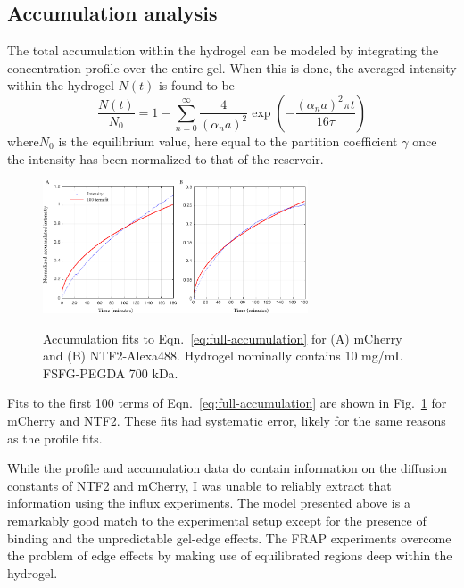\subsection{Accumulation analysis}

The total accumulation within the hydrogel can be modeled by integrating the concentration profile over the entire gel.  When this is done, the averaged intensity within the hydrogel $N(t)$ is found to be
\begin{equation}
\frac{N(t)}{N_0} = 1-\sum_{n=0}^\infty \frac{4}{(\alpha_na)^2}\exp\left(-\frac{(\alpha_na)^2\pi t}{16\tau}\right)
\label{eq:full-accumulation}
\end{equation} where$N_0$ is the equilibrium value, here equal to the partition coefficient $\gamma$ once the intensity has been normalized to that of the reservoir.

\begin{figure}
\caption{Accumulation fits to Eqn.~\ref{eq:full-accumulation} for (A) mCherry and (B) NTF2-Alexa488.  Hydrogel nominally contains 10 mg/mL FSFG-PEGDA 700 kDa.\\}
\centering
\includegraphics[width=0.7\textwidth]{figs/ch04/accumulation.pdf}
\label{fig:acc}
\end{figure} 


Fits to the first 100 terms of Eqn.~\ref{eq:full-accumulation} are shown in Fig.~\ref{fig:acc} for mCherry and NTF2.  These fits had systematic error, likely for the same reasons as the profile fits.

While the profile and accumulation data do contain information on the diffusion constants of NTF2 and mCherry, I was unable to reliably extract that information using the influx experiments.  The model presented above is a remarkably good match to the experimental setup except for the presence of binding and the unpredictable gel-edge effects.  The FRAP experiments overcome the problem of edge effects by making use of equilibrated regions deep within the hydrogel.

